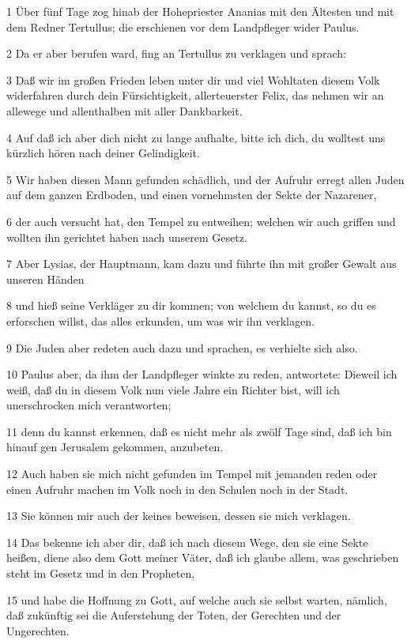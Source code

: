 \par 1 Über fünf Tage zog hinab der Hohepriester Ananias mit den Ältesten und mit dem Redner Tertullus; die erschienen vor dem Landpfleger wider Paulus.
\par 2 Da er aber berufen ward, fing an Tertullus zu verklagen und sprach:
\par 3 Daß wir im großen Frieden leben unter dir und viel Wohltaten diesem Volk widerfahren durch dein Fürsichtigkeit, allerteuerster Felix, das nehmen wir an allewege und allenthalben mit aller Dankbarkeit.
\par 4 Auf daß ich aber dich nicht zu lange aufhalte, bitte ich dich, du wolltest uns kürzlich hören nach deiner Gelindigkeit.
\par 5 Wir haben diesen Mann gefunden schädlich, und der Aufruhr erregt allen Juden auf dem ganzen Erdboden, und einen vornehmsten der Sekte der Nazarener,
\par 6 der auch versucht hat, den Tempel zu entweihen; welchen wir auch griffen und wollten ihn gerichtet haben nach unserem Gesetz.
\par 7 Aber Lysias, der Hauptmann, kam dazu und führte ihn mit großer Gewalt aus unseren Händen
\par 8 und hieß seine Verkläger zu dir kommen; von welchem du kannst, so du es erforschen willst, das alles erkunden, um was wir ihn verklagen.
\par 9 Die Juden aber redeten auch dazu und sprachen, es verhielte sich also.
\par 10 Paulus aber, da ihm der Landpfleger winkte zu reden, antwortete: Dieweil ich weiß, daß du in diesem Volk nun viele Jahre ein Richter bist, will ich unerschrocken mich verantworten;
\par 11 denn du kannst erkennen, daß es nicht mehr als zwölf Tage sind, daß ich bin hinauf gen Jerusalem gekommen, anzubeten.
\par 12 Auch haben sie mich nicht gefunden im Tempel mit jemanden reden oder einen Aufruhr machen im Volk noch in den Schulen noch in der Stadt.
\par 13 Sie können mir auch der keines beweisen, dessen sie mich verklagen.
\par 14 Das bekenne ich aber dir, daß ich nach diesem Wege, den sie eine Sekte heißen, diene also dem Gott meiner Väter, daß ich glaube allem, was geschrieben steht im Gesetz und in den Propheten,
\par 15 und habe die Hoffnung zu Gott, auf welche auch sie selbst warten, nämlich, daß zukünftig sei die Auferstehung der Toten, der Gerechten und der Ungerechten.
